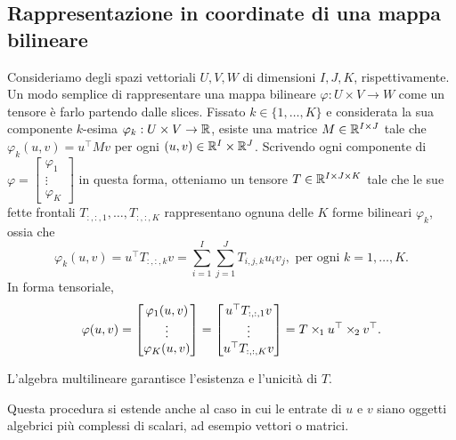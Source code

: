 \subsection*{Rappresentazione in coordinate di una mappa bilineare}
Consideriamo degli spazi vettoriali $ U,V,W $ di dimensioni $ I,J,K $, rispettivamente. Un modo
semplice di rappresentare una mappa bilineare $ \varphi \colon U \times V \to W $ come un
tensore è farlo partendo dalle slices. Fissato $ k \in \{1, \ldots, K\} $ e
considerata la sua componente $ k $-esima $ \varphi_k : U \times V \to \mathbb{R} $, esiste una matrice $ M \in \mathbb{R}^{I \times J} $ tale che $
	\varphi_k(u,v) = u^{\top}Mv$ per ogni $ (u,v) \in \mathbb{R}^I \times \mathbb{R}^J $. Scrivendo ogni componente di $
	\varphi = \begin{bmatrix} \varphi_1 \\ \vdots \\ \varphi_K \end{bmatrix}$ in questa forma, otteniamo un tensore $ T
	\in \mathbb{R}^{I \times J\times K} $ tale che le sue fette
frontali $ T_{:,:,1}, \ldots, T_{:,:,K} $ rappresentano ognuna delle $ K $ forme bilineari $ \varphi_k $, ossia che
\begin{equation}
	\label{eq:b_k_bil}
	\varphi_k(u,v) = u^{\top}T_{:,:,k}v = \sum_{i=1}^I\sum_{j=1}^J T_{i,j,k}u_iv_j, \text{ per ogni
	} k = 1, \ldots, K
	.\end{equation}
In forma tensoriale,
\begin{equation}
	\label{eq:b_tuv}
	\varphi(u,v) = \begin{bmatrix} \varphi_1(u,v) \\ \vdots \\ \varphi_K(u,v) \end{bmatrix} = \begin{bmatrix}
		u^{\top}T_{:,:,1}v \\
		\vdots             \\ u^{\top}T_{:,:,K}v\end{bmatrix} = T \ttm[1] u^{\top}
	\ttm[2] v^{\top}.
\end{equation}
\begin{remark}
	L'algebra multilineare garantisce l'esistenza e l'unicità di $ T $.
\end{remark}
\begin{remark}
	Questa procedura si estende anche al caso in cui le entrate di $ u $ e $ v $ siano oggetti
	algebrici più complessi di scalari, ad esempio vettori o matrici.
\end{remark}

